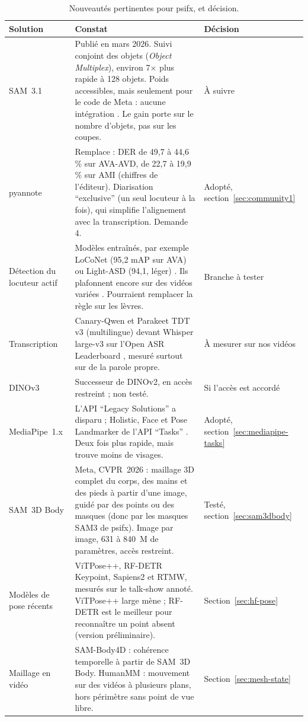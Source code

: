 \documentclass[11pt,a4paper]{report}
\newcommand{\code}[1]{\texttt{\detokenize{#1}}}
\begin{document}
\begin{table}[H]
\centering
\caption{Nouveautés pertinentes pour psifx, et décision.}
\label{tab:veille}
\small
\begin{tabularx}{\textwidth}{@{}lYl@{}}
\toprule
Solution & Constat & Décision \\
\midrule
SAM~3.1 \cite{hf_sam31} & Publié en mars 2026. Suivi conjoint des objets (\emph{Object Multiplex}), environ 7$\times$
plus rapide à 128 objets. Poids accessibles, mais seulement pour le code de Meta : aucune intégration
\code{transformers}. Le gain porte sur le nombre d'objets, pas sur les coupes. & À suivre \\
pyannote \code{community-1} \cite{pyannote_community1} & Remplace \code{3.1} : DER de 49,7 à 44,6\,\% sur AVA-AVD,
de 22,7 à 19,9\,\% sur AMI (chiffres de l'éditeur). Diarisation \enquote{exclusive} (un seul locuteur à la fois), qui
simplifie l'alignement avec la transcription. Demande \code{pyannote.audio} 4. & Adopté, section~\ref{sec:community1} \\
Détection du locuteur actif & Modèles entraînés, par exemple LoCoNet (95,2 mAP sur AVA) ou Light-ASD (94,1, léger)
\cite{wang2023loconet,liao2023lightasd}. Ils plafonnent encore sur des vidéos variées \cite{unitalk2025}. Pourraient
remplacer la règle sur les lèvres. & Branche à tester \\
Transcription & Canary-Qwen et Parakeet TDT v3 (multilingue) devant Whisper large-v3 sur l'Open ASR Leaderboard
\cite{open_asr_leaderboard}, mesuré surtout sur de la parole propre. & À mesurer sur nos vidéos \\
DINOv3 & Successeur de DINOv2, en accès restreint ; non testé. & Si l'accès est accordé \\
MediaPipe~1.x & L'API \enquote{Legacy Solutions} a disparu ; Holistic, Face et Pose Landmarker de l'API
\enquote{Tasks} \cite{mediapipe_holistic_tasks}. Deux fois plus rapide, mais trouve moins de visages. & Adopté,
section~\ref{sec:mediapipe-tasks} \\
SAM~3D Body \cite{sam3dbody2026} & Meta, CVPR~2026 : maillage 3D complet du corps, des mains et des pieds à partir
d'une image, guidé par des points ou des masques (donc par les masques SAM3 de psifx). Image par image, 631 à 840~M
de paramètres, accès restreint. & Testé, section~\ref{sec:sam3dbody} \\
Modèles de pose récents & ViTPose++, RF-DETR Keypoint, Sapiens2 et RTMW, mesurés sur le talk-show annoté. ViTPose++ large mène ; RF-DETR est le
meilleur pour reconnaître un point absent (version préliminaire). & Section~\ref{sec:hf-pose} \\
Maillage en vidéo & SAM-Body4D \cite{sambody4d2025} : cohérence temporelle à partir de SAM~3D Body. HumanMM \cite{zhang2025humanmm} : mouvement sur
des vidéos à plusieurs plans, hors périmètre sans point de vue libre. & Section~\ref{sec:mesh-state} \\
\bottomrule
\end{tabularx}
\end{table}
\end{document}
